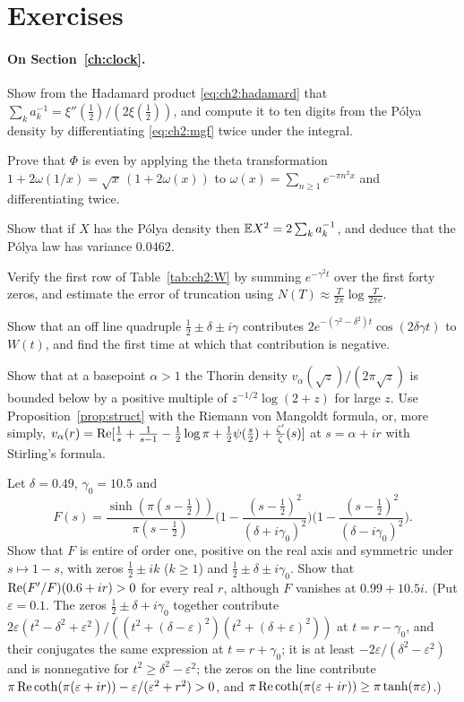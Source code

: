 \section{Exercises}\label{chap:foundations:ex}

\paragraph{On Section~\ref{ch:clock}.}
\begin{exercises}
\item Show from the Hadamard product \eqref{eq:ch2:hadamard} that $\sum_ka_k^{-1}=\xi''(\frac12)/(2\xi(\frac12))$, and compute it to ten digits from the P\'olya density by differentiating \eqref{eq:ch2:mgf} twice under the integral.
\item\label{ex:ch2:even} Prove that $\Phi$ is even by applying the theta transformation $1+2\omega(1/x)=\sqrt x\,(1+2\omega(x))$ to $\omega(x)=\sum_{n\ge1}e^{-\pi n^2x}$ and differentiating twice.
\item Show that if $X$ has the P\'olya density then $\mathbb{E} X^2=2\sum_ka_k^{-1}$, and deduce that the P\'olya law has variance $0.0462$.
\item Verify the first row of Table~\ref{tab:ch2:W} by summing $e^{-\gamma^2t}$ over the first forty zeros, and estimate the error of truncation using $N(T)\approx\frac T{2\pi}\log\frac T{2\pi e}$.
\item Show that an off line quadruple $\frac12\pm\delta\pm i\gamma$ contributes $2e^{-(\gamma^2-\delta^2)t}\cos(2\delta\gamma t)$ to $W(t)$, and find the first time at which that contribution is negative.
\item Show that at a basepoint $\alpha>1$ the Thorin density $v_\alpha(\sqrt z)/(2\pi\sqrt z)$ is bounded below by a positive multiple of $z^{-1/2}\log(2+z)$ for large $z$. Use Proposition~\ref{prop:struct} with the Riemann von Mangoldt formula, or, more simply, $v_\alpha(r)=\operatorname{Re}[\frac1s+\frac1{s-1}-\frac12\log\pi+\frac12\psi(\frac s2)+\frac{\zeta'}\zeta(s)]$ at $s=\alpha+ir$ with Stirling's formula.
\item\label{ex:ch2:line} Let $\delta=0.49$, $\gamma_0=10.5$ and
\[
F(s)=\frac{\sinh(\pi(s-\frac12))}{\pi(s-\frac12)}\Big(1-\frac{(s-\frac12)^2}{(\delta+i\gamma_0)^2}\Big)\Big(1-\frac{(s-\frac12)^2}{(\delta-i\gamma_0)^2}\Big).
\]
Show that $F$ is entire of order one, positive on the real axis and symmetric under $s\mapsto1-s$, with zeros $\frac12\pm ik$ ($k\ge1$) and $\frac12\pm\delta\pm i\gamma_0$. Show that $\operatorname{Re}(F'/F)(0.6+ir)>0$ for every real $r$, although $F$ vanishes at $0.99+10.5i$. (Put $\varepsilon=0.1$. The zeros $\frac12\pm\delta+i\gamma_0$ together contribute $2\varepsilon(t^2-\delta^2+\varepsilon^2)/((t^2+(\delta-\varepsilon)^2)(t^2+(\delta+\varepsilon)^2))$ at $t=r-\gamma_0$, and their conjugates the same expression at $t=r+\gamma_0$; it is at least $-2\varepsilon/(\delta^2-\varepsilon^2)$ and is nonnegative for $t^2\ge\delta^2-\varepsilon^2$; the zeros on the line contribute $\pi\operatorname{Re}\coth(\pi(\varepsilon+ir))-\varepsilon/(\varepsilon^2+r^2)>0$, and $\pi\operatorname{Re}\coth(\pi(\varepsilon+ir))\ge\pi\tanh(\pi\varepsilon)$.)
\end{exercises}

